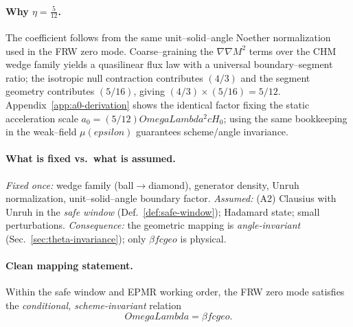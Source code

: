 \documentclass[aps,prd,onecolumn,superscriptaddress,nofootinbib]{revtex4-2}
\def\OmL{OmegaLambda}%
\def\cgeo{cgeo}%
\def\eps{epsilon}%
\newcommand{\OmL}{\Omega_\Lambda}
\newcommand{\cgeo}{c_{\rm geo}}
\newcommand{\eps}{\varepsilon}
\begin{document}
\paragraph{Why $\eta=\frac{5}{12}$.}
The coefficient follows from the same unit--solid--angle Noether normalization used in the FRW zero mode. Coarse--graining the $\nabla\nabla M^2$ terms over the CHM wedge family yields a quasilinear flux law with a universal boundary--segment ratio; the isotropic null contraction contributes $(4/3)$ and the segment geometry contributes $(5/16)$, giving $(4/3)\times(5/16)=5/12$. Appendix~\ref{app:a0-derivation} shows the identical factor fixing the static acceleration scale $a_0=(5/12)\OmL^2 cH_0$; using the same bookkeeping in the weak--field $\mu(\eps)$ guarantees scheme/angle invariance.

\paragraph{What is fixed vs.\ what is assumed.}
\emph{Fixed once:} wedge family (ball$\to$diamond), generator density, Unruh normalization, unit--solid--angle boundary factor. \emph{Assumed:} (A2) Clausius with Unruh in the \emph{safe window} (Def.\ \ref{def:safe-window}); Hadamard state; small perturbations. \emph{Consequence:} the geometric mapping is \emph{angle-invariant} (Sec.\ \ref{sec:theta-invariance}); only $\beta f \cgeo$ is physical.

\paragraph{Clean mapping statement.}
Within the safe window and EPMR working order, the FRW zero mode satisfies the \emph{conditional, scheme-invariant} relation
\begin{equation}
\label{eq:OmegaL-clean}
\OmL=\beta f \cgeo.
\end{equation}
\end{document}
